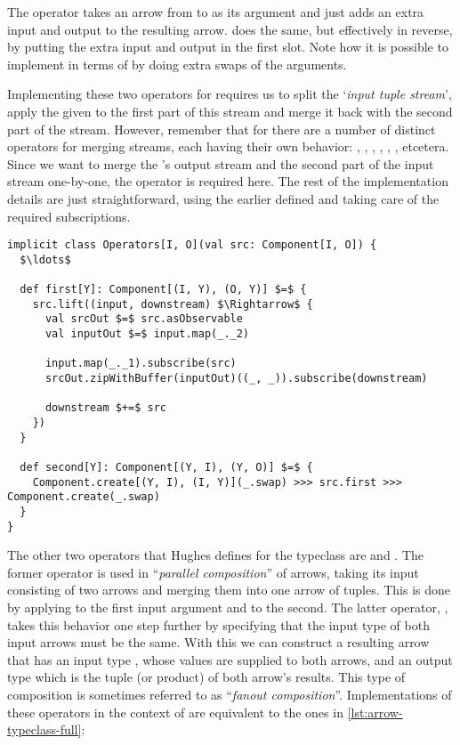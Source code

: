 The operator  takes an arrow from  to  as its argument and just adds an extra input and output to the resulting arrow.  does the same, but effectively in reverse, by putting the extra input and output in the first slot. Note how it is possible to implement  in terms of  by doing extra swaps of the arguments.


Implementing these two operators for \comp requires us to split the `\textit{input tuple stream}', apply the given \comp to the first part of this stream and merge it back with the second part of the stream. However, remember that for \obs there are a number of distinct operators for merging streams, each having their own behavior: , , , , , , etcetera. Since we want to merge the \comp's output stream and the second part of the input stream one-by-one, the  operator is required here. The rest of the implementation details are just straightforward, using the earlier defined  and taking care of the required subscriptions.

\begin{lstlisting}[style=InlineScalaStyle]
implicit class Operators[I, O](val src: Component[I, O]) {
  $\ldots$
  
  def first[Y]: Component[(I, Y), (O, Y)] $=$ {
    src.lift((input, downstream) $\Rightarrow$ {
      val srcOut $=$ src.asObservable
      val inputOut $=$ input.map(_._2)

      input.map(_._1).subscribe(src)
      srcOut.zipWithBuffer(inputOut)((_, _)).subscribe(downstream)

      downstream $+=$ src
    })
  }

  def second[Y]: Component[(Y, I), (Y, O)] $=$ {
    Component.create[(Y, I), (I, Y)](_.swap) >>> src.first >>> Component.create(_.swap)
  }
}
\end{lstlisting}

The other two operators that Hughes defines for the  typeclass are \code{(***)} and \code{(\&\&\&)}. The former operator is used in ``\textit{parallel composition}'' of arrows, taking its input consisting of two arrows and merging them into one arrow of tuples. This is done by applying  to the first input argument and  to the second. The latter operator, \code{(\&\&\&)}, takes this behavior one step further by specifying that the input type of both input arrows must be the same. With this we can construct a resulting arrow that has an input type , whose values are supplied to both arrows, and an output type which is the tuple (or product) of both arrow's results. This type of composition is sometimes referred to as ``\textit{fanout composition}''. Implementations of these operators in the context of \comp are equivalent to the ones in \cref{lst:arrow-typeclass-full}:

